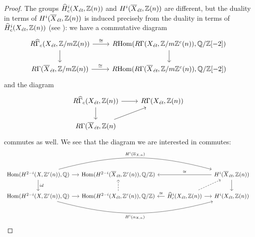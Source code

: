 \documentclass{article}
\numberwithin{equation}{section}
\begin{document}
\begin{lemma}
\begin{proof}
    The groups $\widehat{H}^i_c (X_\et, \ZZ (n))$ and
    $H^i (\overline{X}_\et, \ZZ (n))$ are different, but the duality in terms of
    $H^i (\overline{X}_\et, \ZZ (n))$ is induced precisely from the duality in
    terms of $\widehat{H}^i_c (X_\et, \ZZ (n))$
    (see \cite[Theorem~6.24]{Flach-Morin-2018}): we have a commutative diagram
    \[ \begin{tikzcd}
        R\widehat{\Gamma}_c (X_\et, \ZZ/m\ZZ(n)) \ar{d}\ar{r}{\cong} & \RHom (R\Gamma (X_\et, \ZZ/m\ZZ^c (n)), \QQ/\ZZ [-2])\ar{d} \\
        R\Gamma (\overline{X}_\et, \ZZ/m\ZZ(n)) \ar{r}{\cong} & \RHom (R\Gamma (\overline{X}_\et, \ZZ/m\ZZ^c (n)), \QQ/\ZZ [-2])
      \end{tikzcd} \]
    and the diagram
    \[ \begin{tikzcd}
        R\widehat{\Gamma}_c (X_\et, \ZZ(n)) \ar{r}\ar{d} & R\Gamma (X_\et, \ZZ(n)) \\
        R\Gamma (\overline{X}_\et, \ZZ(n) \ar{ur}
      \end{tikzcd} \]
    commutes as well. We see that the diagram we are interested in commutes:
    \[ \begin{tikzcd}[column sep=1.25em]
        \Hom (H^{2-i} (X, \ZZ^c (n)), \QQ) \ar{r}\ar{d}{id} \ar[bend left=15]{rrr}{H^i (\overline{\alpha}_{X,n})} & \Hom (H^{2-i} (\overline{X}_\et, \ZZ^c (n)), \QQ/\ZZ) & & H^i (\overline{X}_\et, \ZZ(n))\ar{d} \ar{ll}[swap]{\cong} \\
        \Hom (H^{2-i} (X, \ZZ^c (n)), \QQ) \ar{r} \ar[bend right=15]{rrr}[swap]{H^i (\alpha_{X,n})} & \Hom (H^{2-i} (X_\et, \ZZ^c (n)), \QQ/\ZZ) \ar[dashed]{u} & \widehat{H}^i_c (X_\et, \ZZ(n)) \ar{l}[swap]{\cong}\ar{r}\ar[dashed]{ur} & H^i (X_\et, \ZZ(n))
    \end{tikzcd} \]
  \end{proof}
\end{lemma}
\end{document}
